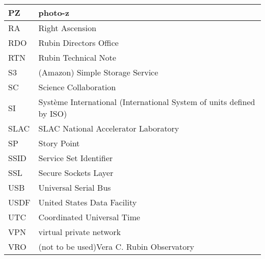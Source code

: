 \begin{longtable}{p{}p{}}
PZ & photo-z \\\hline
RA & Right Ascension \\\hline
RDO & Rubin Directors Office \\\hline
RTN & Rubin Technical Note \\\hline
S3 & (Amazon) Simple Storage Service \\\hline
SC & Science Collaboration \\\hline
SI & Syst\`eme International (International System of units defined by ISO) \\\hline
SLAC & SLAC National Accelerator Laboratory \\\hline
SP & Story Point \\\hline
SSID & Service Set Identifier \\\hline
SSL & Secure Sockets Layer \\\hline
USB & Universal Serial Bus \\\hline
USDF & United States Data Facility \\\hline
UTC & Coordinated Universal Time \\\hline
VPN & virtual private network \\\hline
VRO & (not to be used)Vera C. Rubin Observatory \\\hline
\end{longtable}
